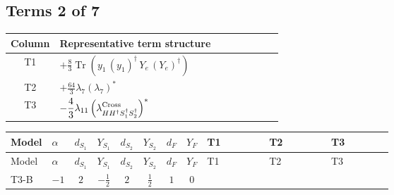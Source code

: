 \documentclass[8pt]{article}
\begin{document}
\begin{landscape}
\subsection*{Terms 2 of 7}
\begin{center}
\begin{tabular}{@{}c >{\raggedright\arraybackslash}p{0.82\linewidth}@{}}
\toprule
Column & Representative term structure \\
\midrule
T1 & \(\displaystyle +\frac{8}{3} \operatorname{Tr}\!\left({y_1}\,\left({y_1}\right)^{\dagger}\,{Y_e}\,\left({Y_e}\right)^{\dagger}\right)\) \\
\midrule
T2 & \(\displaystyle +\frac{64}{3} {\lambda_7} \left({\lambda_7}\right)^{*}\) \\
\midrule
T3 & \(\displaystyle -\frac{4}{3} {\lambda_{11}} \left({\lambda_{H H^\dagger S_1^\dagger S_2^\dagger}^{\rm Cross}}\right)^{*}\) \\
\midrule
\bottomrule
\end{tabular}
\end{center}
\smallskip
\tiny
\begin{longtable}{@{}llcccccc >{\raggedright\arraybackslash}p{0.21\linewidth} >{\raggedright\arraybackslash}p{0.21\linewidth} >{\raggedright\arraybackslash}p{0.21\linewidth}@{}}
\toprule
Model & $\alpha$ & $d_{S_1}$ & $Y_{S_1}$ & $d_{S_2}$ & $Y_{S_2}$ & $d_F$ & $Y_F$ & T1 & T2 & T3 \\
\midrule
\endfirsthead
\toprule
Model & $\alpha$ & $d_{S_1}$ & $Y_{S_1}$ & $d_{S_2}$ & $Y_{S_2}$ & $d_F$ & $Y_F$ & T1 & T2 & T3 \\
\midrule
\endhead
T3-B & $-1$ & $2$ & $-\frac{1}{2}$ & $2$ & $\frac{1}{2}$ & $1$ & $0$ & \scriptsize\adjustbox{max width=\linewidth}{$\begin{gathered} +\frac{8}{3} \operatorname{Tr}\!\left({y_1}\,\left({y_1}\right)^{\dagger}\,{Y_e}\,\left({Y_e}\right)^{\dagger}\right)\end{gathered}$} & \scriptsize\adjustbox{max width=\linewidth}{$\begin{gathered} +\frac{64}{3} {\lambda_7} \left({\lambda_7}\right)^{*}\end{gathered}$} & \scriptsize\adjustbox{max width=\linewidth}{$\begin{gathered} -\frac{4}{3} {\lambda_{11}} \left({\lambda_{H H^\dagger S_1^\dagger S_2^\dagger}^{\rm Cross}}\right)^{*}\end{gathered}$} \\
\midrule

\end{longtable}
\end{landscape}
\end{document}
